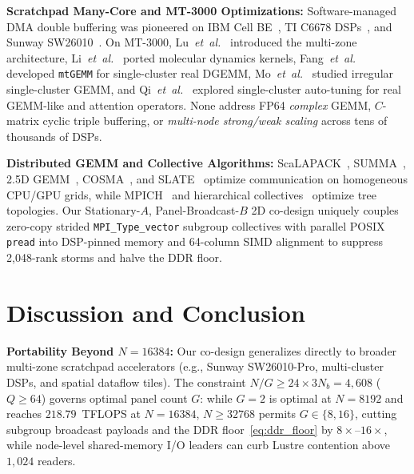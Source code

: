 \documentclass[journal]{IEEEtran}
\begin{document}
\textbf{Scratchpad Many-Core and MT-3000 Optimizations:} Software-managed DMA double buffering was pioneered on IBM Cell BE~\cite{kahle2005cell}, TI C6678 DSPs~\cite{igual2012dsp}, and Sunway SW26010~\cite{fu2016sunway, jiang2017sw26010}. On MT-3000, Lu~\emph{et~al.}~\cite{lu2022mt3000} introduced the multi-zone architecture, Li~\emph{et~al.}~\cite{li2024md} ported molecular dynamics kernels, Fang~\emph{et~al.}~\cite{fang2026mtgemm} developed \texttt{mtGEMM} for single-cluster real DGEMM, Mo~\emph{et~al.}~\cite{mo2024irregular} studied irregular single-cluster GEMM, and Qi~\emph{et~al.}~\cite{qi2025constraint, qi2026attention} explored single-cluster auto-tuning for real GEMM-like and attention operators. None address FP64 \emph{complex} GEMM, $C$-matrix cyclic triple buffering, or \emph{multi-node strong/weak scaling} across tens of thousands of DSPs.

\textbf{Distributed GEMM and Collective Algorithms:} ScaLAPACK~\cite{choi1996scalapack}, SUMMA~\cite{vandegeijn1997summa}, 2.5D GEMM~\cite{solomonik2011comm25d}, COSMA~\cite{kwasniewski2019cosma}, and SLATE~\cite{gates2019slate} optimize communication on homogeneous CPU/GPU grids, while MPICH~\cite{thakur2005mpich} and hierarchical collectives~\cite{parsons2014hierarchical} optimize tree topologies. Our Stationary-$A$, Panel-Broadcast-$B$ 2D co-design uniquely couples zero-copy strided \texttt{MPI\_Type\_vector} subgroup collectives with parallel POSIX \texttt{pread} into DSP-pinned memory and 64-column SIMD alignment to suppress 2,048-rank storms and halve the DDR floor.

\section{Discussion and Conclusion}
\label{sec:conclusion}
\textbf{Portability Beyond $N=16384$:} Our co-design generalizes directly to broader multi-zone scratchpad accelerators (e.g., Sunway SW26010-Pro, multi-cluster DSPs, and spatial dataflow tiles). The constraint $N/G \ge 24 \times 3 N_b = 4{,}608$ ($Q \ge 64$) governs optimal panel count $G$: while $G=2$ is optimal at $N=8192$ and reaches $218.79$~TFLOPS at $N=16384$, $N \ge 32768$ permits $G \in \{8, 16\}$, cutting subgroup broadcast payloads and the DDR floor~\eqref{eq:ddr_floor} by $8\times$--$16\times$, while node-level shared-memory I/O leaders can curb Lustre contention above $1{,}024$ readers.
\end{document}
